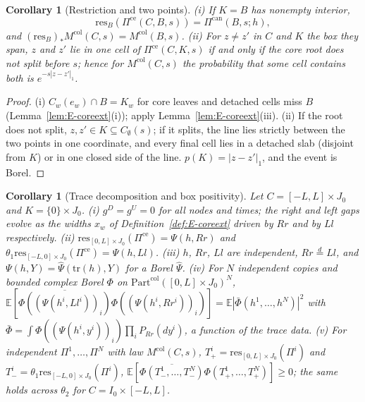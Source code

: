 \documentclass[11pt]{article}
\theoremstyle{plain}
\newtheorem{corollary}[theorem]{Corollary}
\theoremstyle{definition}
\theoremstyle{remark}
\newcommand{\E}{\mathbb{E}}
\newcommand{\Part}{\mathrm{Part}}
\newcommand{\Mcol}{M^{\mathrm{col}}}
\newcommand{\resB}{\mathrm{res}}
\newcommand{\trd}{\mathrm{tr}}
\newcommand{\conj}[1]{\overline{#1}}
\begin{document}
\begin{corollary}[Restriction and two points]\label{cor:E-restriction}
(i) If $K=B$ has nonempty interior,
\[
\resB_B(\Pi^{\mathrm{ce}}(C,B,s))=\Pi^{\mathrm{can}}(B,s;h),
\]
and $(\resB_B)_*\Mcol(C,s)=\Mcol(B,s)$. (ii) For $z\ne z'$ in $C$ and $K$ the box they span, $z$ and
$z'$ lie in one cell of $\Pi^{\mathrm{ce}}(C,K,s)$ if and only if the core root does not split
before $s$; hence for $\Mcol(C,s)$ the probability that some cell contains both is
$e^{-s|z-z'|_1}$.
\end{corollary}

\begin{proof}
(i) $C_w(e_w)\cap B=K_w$ for core leaves and detached cells miss $B$
(Lemma~\ref{lem:E-coreext}(i)); apply Lemma~\ref{lem:E-coreext}(iii). (ii) If the root does
not split, $z,z'\in K\subseteq C_\emptyset(s)$; if it splits, the line lies strictly between the two
points in one coordinate, and every final cell lies in a detached slab (disjoint
from $K$) or in one closed side of the line. $p(K)=|z-z'|_1$, and the event is Borel.
\end{proof}

\begin{corollary}[Trace decomposition and box positivity]\label{cor:E-tracebox}
Let $C=[-L,L]\times J_0$ and $K=\{0\}\times J_0$. (i) $g^{D}=g^{U}=0$ for all nodes and times; the
right and left gaps evolve as the widths $x_w$ of Definition~\ref{def:E-coreext} driven by
$Rr$ and by $Ll$ respectively. (ii) $\resB_{[0,L]\times J_0}(\Pi^{\mathrm{ce}})=\Psi(h,Rr)$ and
$\theta_1\resB_{[-L,0]\times J_0}(\Pi^{\mathrm{ce}})=\Psi(h,Ll)$. (iii) $h$, $Rr$, $Ll$ are independent,
$Rr\overset{d}{=}Ll$, and $\Psi(h,Y)=\hat\Psi(\trd(h),Y)$ for a Borel $\hat\Psi$. (iv) For $N$ independent
copies and bounded complex Borel $\Phi$ on $\Part^{\mathrm{col}}([0,L]\times J_0)^{N}$,
$\E[\conj{\Phi((\Psi(h^{i},Ll^{i}))_i)}\Phi((\Psi(h^{i},Rr^{i}))_i)]=\E|\bar\Phi(h^{1},\dots,h^{N})|^{2}$ with
$\bar\Phi=\int\Phi((\Psi(h^{i},y^{i}))_i)\prod_iP_{Rr}(dy^{i})$, a function of the trace data. (v) For independent
$\Pi^{1},\dots,\Pi^{N}$ with law $\Mcol(C,s)$, $T^{i}_{+}=\resB_{[0,L]\times J_0}(\Pi^{i})$ and
$T^{i}_{-}=\theta_1\resB_{[-L,0]\times J_0}(\Pi^{i})$, $\E[\conj{\Phi(T^{1}_{-},\dots,T^{N}_{-})}\Phi(T^{1}_{+},\dots,T^{N}_{+})]\ge0$; the
same holds across $\theta_2$ for $C=I_0\times[-L,L]$.
\end{corollary}
\end{document}
